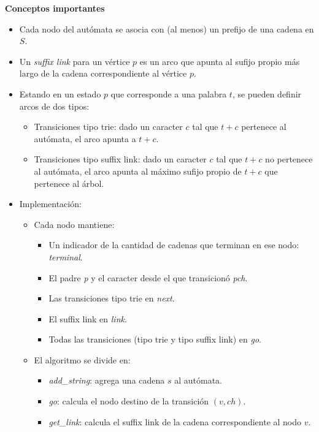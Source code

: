 \textbf{Conceptos importantes}
\begin{itemize}
	\item Cada nodo del autómata se asocia con (al menos) un prefijo de una cadena en $S$.
	\item Un \emph{suffix link} para un vértice $p$ es un arco que apunta al sufijo propio
	más largo de la cadena correspondiente al vértice $p$.
	\item Estando en un estado $p$ que corresponde a una palabra $t$, se pueden definir 
	arcos de dos tipos:
	\begin{itemize}
		\item Transiciones tipo trie: dado un caracter $c$ tal que $t + c$ pertenece al autómata,
		el arco apunta a $t + c$.
		\item Transiciones tipo suffix link: dado un caracter $c$ tal que $t + c$ no pertenece al
		autómata, el arco apunta al máximo sufijo propio de $t + c$ que pertenece al árbol.
	\end{itemize}
	\item Implementación:
	\begin{itemize}
		\item Cada nodo mantiene:
		\begin{itemize} 
			\item Un indicador de la cantidad de cadenas que terminan en ese nodo: \emph{terminal}.
			\item El padre \emph{p} y el caracter desde el que transicionó \emph{pch}.
			\item Las transiciones tipo trie en \emph{next}.
			\item El suffix link en \emph{link}.
			\item Todas las transiciones (tipo trie y tipo suffix link) en \emph{go}.
		\end{itemize}
		\item El algoritmo se divide en:
		\begin{itemize}
			\item \emph{add\_string}: agrega una cadena $s$ al autómata.
			\item \emph{go}: calcula el nodo destino de la transición $(v, ch)$.
			\item \emph{get\_link}: calcula el suffix link de la cadena correspondiente al nodo $v$.
		\end{itemize}
	\end{itemize}
\end{itemize}

